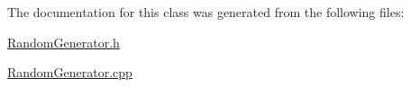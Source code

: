 The documentation for this class was generated from the following files\+:\begin{DoxyCompactItemize}
\item 
\hyperlink{_random_generator_8h}{Random\+Generator.\+h}\item 
\hyperlink{_random_generator_8cpp}{Random\+Generator.\+cpp}\end{DoxyCompactItemize}

